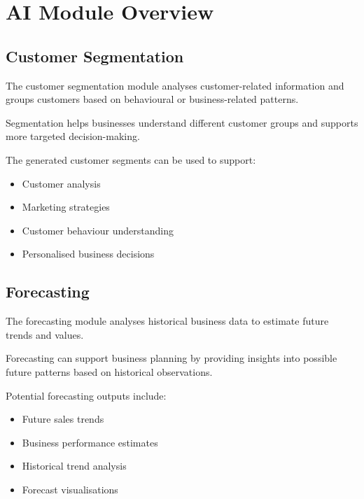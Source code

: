 \documentclass[12pt,a4paper]{report}
\begin{document}

\section{AI Module Overview}

\subsection{Customer Segmentation}

The customer segmentation module analyses customer-related information
and groups customers based on behavioural or business-related patterns.

Segmentation helps businesses understand different customer groups and
supports more targeted decision-making.

The generated customer segments can be used to support:

\begin{itemize}[leftmargin=1.2cm]
    \item Customer analysis
    \item Marketing strategies
    \item Customer behaviour understanding
    \item Personalised business decisions
\end{itemize}


\subsection{Forecasting}

The forecasting module analyses historical business data to estimate
future trends and values.

Forecasting can support business planning by providing insights into
possible future patterns based on historical observations.

Potential forecasting outputs include:

\begin{itemize}[leftmargin=1.2cm]
    \item Future sales trends
    \item Business performance estimates
    \item Historical trend analysis
    \item Forecast visualisations
\end{itemize}
\end{document}

